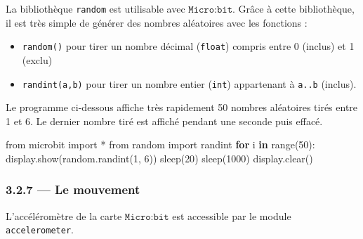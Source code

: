 \documentclass[a4paper,17pt]{extarticle}
\providecommand{\tightlist}{%
      \setlength{\itemsep}{0pt}\setlength{\parskip}{0pt}}
\newenvironment{Shaded}{}{}
\newcommand{\KeywordTok}[1]{\textcolor[rgb]{0.00,0.44,0.13}{\textbf{{#1}}}}
\newcommand{\DecValTok}[1]{\textcolor[rgb]{0.25,0.63,0.44}{{#1}}}
\newcommand{\NormalTok}[1]{{#1}}
\newcommand{\ImportTok}[1]{{#1}}
\newcommand{\ControlFlowTok}[1]{\textcolor[rgb]{0.00,0.44,0.13}{\textbf{{#1}}}}
\newcommand{\OperatorTok}[1]{\textcolor[rgb]{0.40,0.40,0.40}{{#1}}}
\newcommand{\BuiltInTok}[1]{{#1}}
\begin{document}
La bibliothèque \texttt{random} est utilisable avec
\(\texttt{Micro:bit}\). Grâce à cette bibliothèque, il est très simple
de générer des nombres aléatoires avec les fonctions :

\begin{itemize}
\tightlist
\item
  \texttt{random()} pour tirer un nombre décimal (\texttt{float})
  compris entre 0 (inclus) et 1 (exclu)
\item
  \texttt{randint(a,b)} pour tirer un nombre entier (\texttt{int})
  appartenant à \texttt{a..b} (inclus).
\end{itemize}
\begin{exemple}
    Le programme ci-dessous affiche très rapidement 50 nombres aléatoires
tirés entre 1 et 6. Le dernier nombre tiré est affiché pendant une
seconde puis effacé.

\begin{Shaded}
\begin{Highlighting}[]
\ImportTok{from}\NormalTok{ microbit }\ImportTok{import} \OperatorTok{*}
\ImportTok{from}\NormalTok{ random }\ImportTok{import}\NormalTok{ randint}
\ControlFlowTok{for}\NormalTok{ i }\KeywordTok{in} \BuiltInTok{range}\NormalTok{(}\DecValTok{50}\NormalTok{):}
\NormalTok{    display.show(random.randint(}\DecValTok{1}\NormalTok{, }\DecValTok{6}\NormalTok{))}
\NormalTok{    sleep(}\DecValTok{20}\NormalTok{)}
\NormalTok{sleep(}\DecValTok{1000}\NormalTok{)}
\NormalTok{display.clear()}
\end{Highlighting}
\end{Shaded}

        \end{exemple}
    \hypertarget{le-mouvement}{%
\subsubsection{3.2.7 --- Le mouvement}\label{le-mouvement}}

L'accéléromètre de la carte \(\texttt{Micro:bit}\) est accessible par le
module \texttt{accelerometer}.
\end{document}

